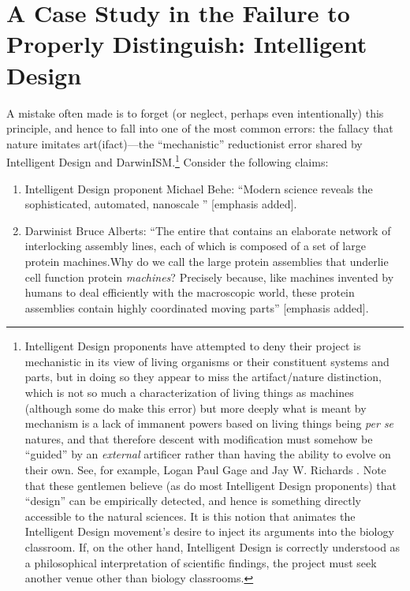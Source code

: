 \section{A Case Study in the Failure to Properly Distinguish: Intelligent Design}

A mistake often made is to forget (or neglect, perhaps even intentionally) this principle, and hence to fall into one of the most common errors: the fallacy that nature imitates art(ifact)---the ``mechanistic'' reductionist error shared by Intelligent Design and DarwinISM.\footnote{%
Intelligent Design proponents have attempted to deny their project is mechanistic in its view of living organisms or their constituent systems and parts, but in doing so they appear to miss the \mbox{artifact/nature} distinction, which is not so much a characterization of living things as machines (although some do make this error) but more deeply what is meant by mechanism is a lack of immanent powers based on living things being \textit{per se} natures, and that therefore descent with modification must somehow be “guided” by an \textit{external} artificer rather than having the ability to evolve on their own. See, for example, Logan Paul Gage \citeyearpar{gage2010} and Jay W. Richards \citeyearpar{richards2010b}.
Note that these gentlemen believe (as do most Intelligent Design proponents) that “design” can be empirically detected, and hence is something directly accessible to the natural sciences. It is this notion that animates the Intelligent Design movement’s desire to inject its arguments into the biology classroom. If, on the other hand, Intelligent Design is correctly understood as a philosophical interpretation of scientific findings, the project must seek another venue other than biology classrooms.
} Consider the following claims:

\begin{enumerate}
\item {} Intelligent Design proponent Michael Behe: ``Modern science reveals the  sophisticated, automated, nanoscale '' \citep{beheinterview} [emphasis added].
\item {} Darwinist Bruce Alberts: ``The entire  that contains an elaborate network of interlocking assembly lines, each of which is composed of a set of large protein machines.{\jdots}Why do we call the large protein assemblies that underlie cell function protein \emph{machines}? Precisely because, like machines invented by humans to deal efficiently with the macroscopic world, these protein assemblies contain highly coordinated moving parts'' \citep[][p.~291]{balberts} [emphasis added].
\end{enumerate}

